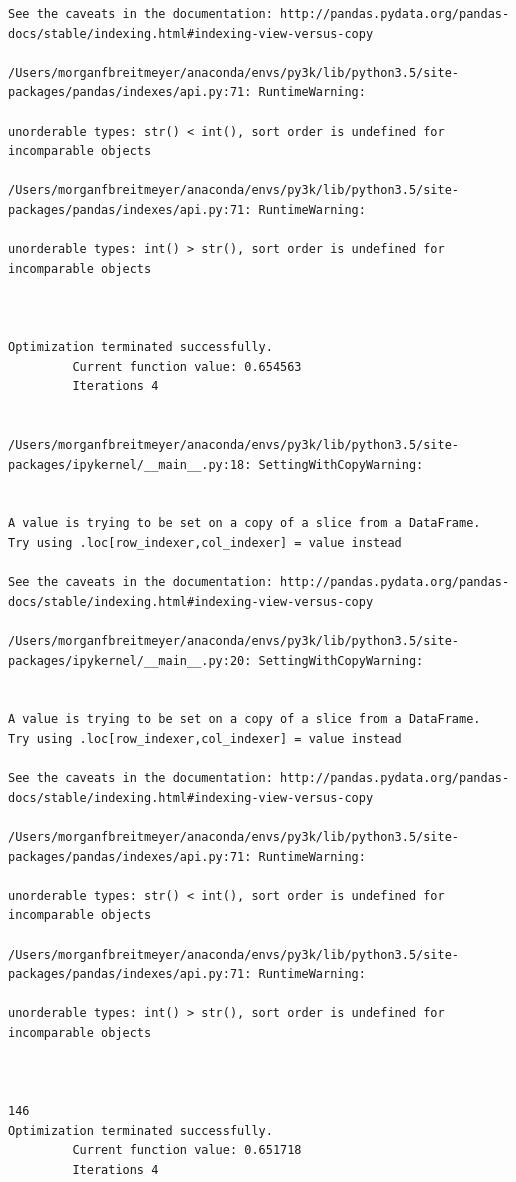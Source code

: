 \begin{lstlisting}
See the caveats in the documentation: http://pandas.pydata.org/pandas-docs/stable/indexing.html#indexing-view-versus-copy

/Users/morganfbreitmeyer/anaconda/envs/py3k/lib/python3.5/site-packages/pandas/indexes/api.py:71: RuntimeWarning:

unorderable types: str() < int(), sort order is undefined for incomparable objects

/Users/morganfbreitmeyer/anaconda/envs/py3k/lib/python3.5/site-packages/pandas/indexes/api.py:71: RuntimeWarning:

unorderable types: int() > str(), sort order is undefined for incomparable objects



Optimization terminated successfully.
         Current function value: 0.654563
         Iterations 4


/Users/morganfbreitmeyer/anaconda/envs/py3k/lib/python3.5/site-packages/ipykernel/__main__.py:18: SettingWithCopyWarning:


A value is trying to be set on a copy of a slice from a DataFrame.
Try using .loc[row_indexer,col_indexer] = value instead

See the caveats in the documentation: http://pandas.pydata.org/pandas-docs/stable/indexing.html#indexing-view-versus-copy

/Users/morganfbreitmeyer/anaconda/envs/py3k/lib/python3.5/site-packages/ipykernel/__main__.py:20: SettingWithCopyWarning:


A value is trying to be set on a copy of a slice from a DataFrame.
Try using .loc[row_indexer,col_indexer] = value instead

See the caveats in the documentation: http://pandas.pydata.org/pandas-docs/stable/indexing.html#indexing-view-versus-copy

/Users/morganfbreitmeyer/anaconda/envs/py3k/lib/python3.5/site-packages/pandas/indexes/api.py:71: RuntimeWarning:

unorderable types: str() < int(), sort order is undefined for incomparable objects

/Users/morganfbreitmeyer/anaconda/envs/py3k/lib/python3.5/site-packages/pandas/indexes/api.py:71: RuntimeWarning:

unorderable types: int() > str(), sort order is undefined for incomparable objects



146
Optimization terminated successfully.
         Current function value: 0.651718
         Iterations 4



\end{lstlisting}
